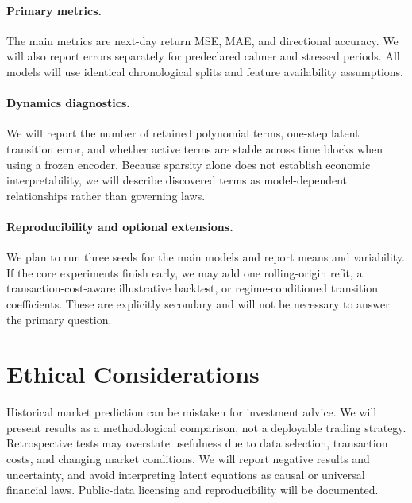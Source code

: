 \documentclass{article}
\begin{document}
\paragraph{Primary metrics.}
The main metrics are next-day return MSE, MAE, and directional accuracy. We will also report errors separately for predeclared calmer and stressed periods. All models will use identical chronological splits and feature availability assumptions.

\paragraph{Dynamics diagnostics.}
We will report the number of retained polynomial terms, one-step latent transition error, and whether active terms are stable across time blocks when using a frozen encoder. Because sparsity alone does not establish economic interpretability, we will describe discovered terms as model-dependent relationships rather than governing laws.

\paragraph{Reproducibility and optional extensions.}
We plan to run three seeds for the main models and report means and variability. If the core experiments finish early, we may add one rolling-origin refit, a transaction-cost-aware illustrative backtest, or regime-conditioned transition coefficients. These are explicitly secondary and will not be necessary to answer the primary question.

\section{Ethical Considerations}
Historical market prediction can be mistaken for investment advice. We will present results as a methodological comparison, not a deployable trading strategy. Retrospective tests may overstate usefulness due to data selection, transaction costs, and changing market conditions. We will report negative results and uncertainty, and avoid interpreting latent equations as causal or universal financial laws. Public-data licensing and reproducibility will be documented.
\end{document}
